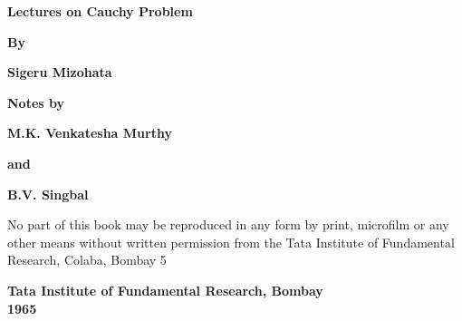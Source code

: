 \thispagestyle{empty}
\begin{center}
{\Large\bf Lectures on Cauchy Problem}
\vskip 1cm

{\bf By}
\medskip

{\large\bf Sigeru Mizohata}\\
\vfill

{\bf Notes by}
\medskip

{\large\bf M.K. Venkatesha Murthy}
\medskip

{\bf and}
\medskip

{\large\bf B.V. Singbal}

\vfill

\parbox{0.7\textwidth}{No part of this book may be reproduced
in any form by print, microfilm or any other means without written permission
from the Tata Institute of Fundamental Research, Colaba, Bombay 5}
\vfill

{\bf Tata Institute of Fundamental Research, Bombay}\\
{\bf 1965}
\end{center}
\eject
